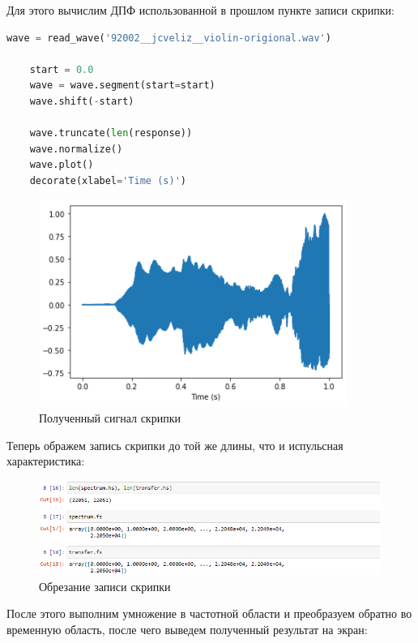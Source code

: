 \documentclass[a4paper]{article}
\begin{document}
            Для этого вычислим ДПФ использованной в прошлом пункте записи скрипки:
            
\begin{lstlisting}[language=Python, caption= Получение сигнала скрипки]
    wave = read_wave('92002__jcveliz__violin-origional.wav')
    
    start = 0.0
    wave = wave.segment(start=start)
    wave.shift(-start)
    
    wave.truncate(len(response))
    wave.normalize()
    wave.plot()
    decorate(xlabel='Time (s)')
\end{lstlisting}
            
            \begin{figure}[H]
                \centering
                \includegraphics{ex_2_4.png}
                \caption{Полученный сигнал скрипки}
                \label{fig:ex_2_4}
            \end{figure}
            
            Теперь ображем запись скрипки до той же длины, что и испульсная характеристика:
            
            \begin{figure}[H]
                \centering
                \includegraphics[width=\textwidth]{ex_2_5.png}
                \caption{Обрезание записи скрипки}
                \label{fig:ex_2_5}
            \end{figure}
            
            После этого выполним умножение в частотной области и преобразуем обратно во временную область, после чего выведем полученный результат на экран:
            
\end{document}
